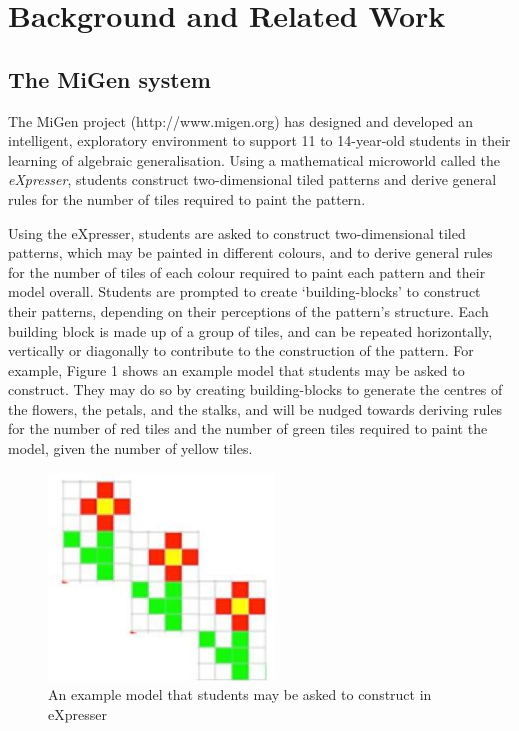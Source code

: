 
\section{Background and Related Work}
\label{sec:backgr-relat-work}


\subsection{The MiGen system}
\label{sec:migen-system}

The MiGen project (http://www.migen.org) has designed and developed an
intelligent, exploratory environment to support 11 to 14-year-old
students in their learning of algebraic generalisation. Using a
mathematical microworld called the {\em eXpresser}, students construct
two-dimensional tiled patterns and derive general rules for the number
of tiles required to paint the pattern. 

Using the eXpresser, students are asked to construct
two-dimensional tiled patterns, which may be painted in different
colours, and to derive general rules for the number of tiles of each
colour required to paint each pattern and their model
overall. Students are prompted to create `building-blocks' to
construct their patterns, depending on their perceptions of the
pattern’s structure. Each building block is made up of a group of
tiles, and can be repeated horizontally, vertically or diagonally to
contribute to the construction of the pattern. For example, Figure 1
shows an example model that students may be asked to construct. They
may do so by creating building-blocks to
generate the centres of the flowers, the petals, and the stalks, and
will be nudged
towards deriving rules for the number of red tiles and the number of
green tiles required to paint the model, given the number of yellow
tiles.

\begin{figure}[htbp]
  \centering
  \includegraphics[width=6cm]{gfx/example.eps}
  \caption{An example model that students may be asked to construct in
    eXpresser} 
  \label{fig:example}
\end{figure}


